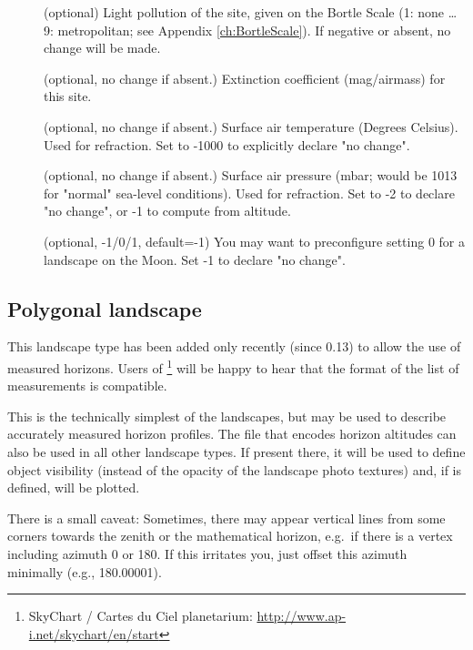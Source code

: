 \begin{description}
\item[] (optional) Light pollution of the site,
  given on the Bortle Scale (1: none \ldots 9: metropolitan; see
  Appendix \ref{ch:BortleScale}). If negative or absent, no change
  will be made.
\item[] (optional, no change
  if absent.) Extinction coefficient (mag/airmass) for this site.
\item[] (optional, no change if absent.)
  Surface air temperature (Degrees Celsius). Used for refraction. Set
  to -1000 to explicitly declare "no change".
\item[] (optional, no change if absent.)
  Surface air pressure (mbar; would be 1013 for "normal" sea-level
  conditions). Used for refraction. Set to -2 to declare "no change",
  or -1 to compute from altitude.
\item[] (optional, -1/0/1, default=-1) You may want
  to preconfigure setting 0 for a landscape on the Moon. Set -1 to
  declare "no change".
\end{description}


\subsection{Polygonal landscape}
\label{sec:landscapes:Polygonal}

This landscape type has been added only recently (since 0.13) to allow
the use of measured horizons. Users of \footnote{SkyChart / Cartes du Ciel planetarium:
  \url{http://www.ap-i.net/skychart/en/start}} will be happy to hear
that the format of the list of measurements is compatible.

This is the technically simplest of the landscapes, but may be used to
describe accurately measured horizon profiles. The file that encodes
horizon altitudes can also be used in all other landscape types. If
present there, it will be used to define object visibility (instead of
the opacity of the landscape photo textures) and, if
 is defined, will be plotted.

There is a small caveat: Sometimes, there may appear vertical lines
from some corners towards the zenith or the mathematical horizon,
e.g.\ if there is a vertex including azimuth 0 or 180. If this
irritates you, just offset this azimuth minimally (e.g., 180.00001).

